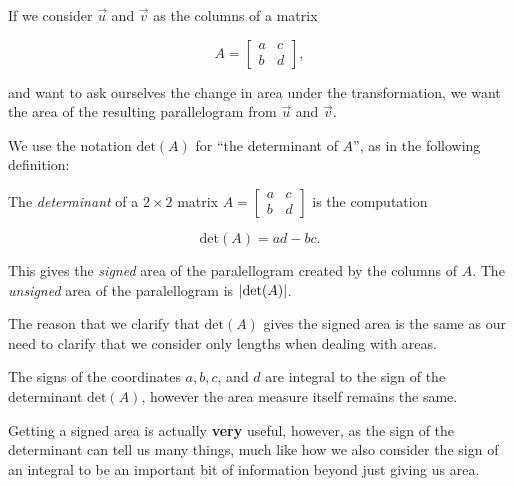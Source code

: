 \documentclass{ximera}
\begin{document}
        
      If we consider $\vec{u}$ and $\vec{v}$ as the columns of a matrix 

      $$A=\begin{bmatrix}
      a&c\\b&d
      \end{bmatrix},$$
      
      and want to ask ourselves the change in area under the transformation, we want the area of the resulting parallelogram from $\vec{u}$ and $\vec{v}$. 

      We use the notation $\mbox{det}(A)$ for ``the determinant of $A$'', as in the following definition:

      \begin{definition}
        The \emph{determinant} of a $2\times 2$ matrix $A=\begin{bmatrix}
          a&c\\b&d
        \end{bmatrix}$ is the computation 

        $$\mbox{det}(A)=ad-bc.$$

        This gives the \emph{signed} area of the paralellogram created by the columns of $A$. The \emph{unsigned} area of the paralellogram is $\left|\mbox{det}(A)\right|$.
      \end{definition}

      \begin{remark}
        The reason that we clarify that $\mbox{det}(A)$ gives the signed area is the same as our need to clarify that we consider only lengths when dealing with areas. 

        The signs of the coordinates $a, b, c$, and $d$ are integral to the sign of the determinant $\mbox{det}(A)$, however the area measure itself remains the same.

        Getting a signed area is actually {\bf very} useful, however, as the sign of the determinant can tell us many things, much like how we also consider the sign of an integral to be an important bit of information beyond just giving us area.
      \end{remark}
        
\end{document}
